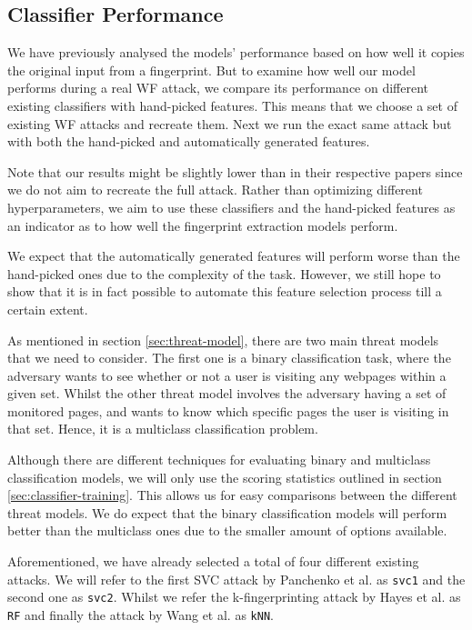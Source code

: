 \subsection{Classifier Performance}

We have previously analysed the models' performance based on how well it copies the original input from a fingerprint.
But to examine how well our model performs during a real WF attack, we compare its performance on different existing classifiers with hand-picked features.
This means that we choose a set of existing WF attacks and recreate them.
Next we run the exact same attack but with both the hand-picked and automatically generated features.

Note that our results might be slightly lower than in their respective papers since we do not aim to recreate the full attack.
Rather than optimizing different hyperparameters, we aim to use these classifiers and the hand-picked features as an indicator as to how well the fingerprint extraction models perform.

We expect that the automatically generated features will perform worse than the hand-picked ones due to the complexity of the task.
However, we still hope to show that it is in fact possible to automate this feature selection process till a certain extent.

As mentioned in section \ref{sec:threat-model}, there are two main threat models that we need to consider.
The first one is a binary classification task, where the adversary wants to see whether or not a user is visiting any webpages within a given set.
Whilst the other threat model involves the adversary having a set of monitored pages, and wants to know which specific pages the user is visiting in that set.
Hence, it is a multiclass classification problem.

Although there are different techniques for evaluating binary and multiclass classification models, we will only use the scoring statistics outlined in section \ref{sec:classifier-training}.
This allows us for easy comparisons between the different threat models.
We do expect that the binary classification models will perform better than the multiclass ones due to the smaller amount of options available.

Aforementioned, we have already selected a total of four different existing attacks.
We will refer to the first SVC attack by Panchenko et al. \cite{panchenko1} as \texttt{svc1} and the second one \cite{panchenko2} as \texttt{svc2}.
Whilst we refer the k-fingerprinting attack by Hayes et al. \cite{kfingerprinting} as \texttt{RF} and finally the attack by Wang et al. \cite{wang_cai_johnson_nithyanand_goldberg_2014} as \texttt{kNN}.

